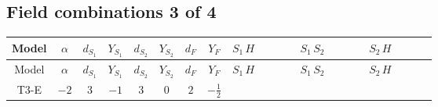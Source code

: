 \documentclass[8pt]{article}
\begin{document}
\begin{landscape}
\subsection*{Field combinations 3 of 4}
\begin{longtable}{@{}cccccccc >{\raggedright\arraybackslash}p{0.21\linewidth} >{\raggedright\arraybackslash}p{0.21\linewidth} >{\raggedright\arraybackslash}p{0.21\linewidth}@{}}
\toprule
Model & $\alpha$ & $d_{S_1}$ & $Y_{S_1}$ & $d_{S_2}$ & $Y_{S_2}$ & $d_F$ & $Y_F$ & $S_1\,H$ & $S_1\,S_2$ & $S_2\,H$ \\
\midrule
\endfirsthead
\toprule
Model & $\alpha$ & $d_{S_1}$ & $Y_{S_1}$ & $d_{S_2}$ & $Y_{S_2}$ & $d_F$ & $Y_F$ & $S_1\,H$ & $S_1\,S_2$ & $S_2\,H$ \\
\midrule
\endhead
T3-E & $-2$ & $3$ & $-1$ & $3$ & $0$ & $2$ & $-\frac{1}{2}$ & \scriptsize\adjustbox{max width=\linewidth}{$\begin{gathered} +\frac{1}{2} H_{a_2} S_{1,j_2} H_{a_1}{}^{\dagger } S_{1,j_1}{}^{\dagger } \mathcal{I}_{H1,a_1,a_2,j_1,j_2}{}^1 \lambda_{HS_1}^{(1)}^{(1)} \\ +\frac{1}{2} H_{a_2} S_{1,j_2} H_{a_1}{}^{\dagger } S_{1,j_1}{}^{\dagger } \mathcal{I}_{H1,a_1,a_2,j_2,j_1}{}^1 \lambda_{HS_1}^{(1)}^{(1)} \\ +\frac{1}{2} H_{a_2} S_{1,j_2} H_{a_1}{}^{\dagger } S_{1,j_1}{}^{\dagger } \mathcal{I}_{H1,a_1,a_2,j_1,j_2}{}^2 \lambda_{HS_1}^{(1)}^{(2)}\end{gathered}$} & \scriptsize\adjustbox{max width=\linewidth}{$\begin{gathered} +S_{1,j_3} S_{2,j_4} S_{1,j_1}{}^{\dagger } S_{2,j_2}{}^{\dagger } \mathcal{I}_{12,j_1,j_3,j_2,j_4}{}^1 \lambda_{12}^{(1)}^{(1)} \\ +S_{1,j_3} S_{2,j_4} S_{1,j_1}{}^{\dagger } S_{2,j_2}{}^{\dagger } \mathcal{I}_{12,j_1,j_3,j_2,j_4}{}^2 \lambda_{12}^{(1)}^{(2)} \\ +S_{1,j_3} S_{2,j_4} S_{1,j_1}{}^{\dagger } S_{2,j_2}{}^{\dagger } \mathcal{I}_{12,j_1,j_3,j_2,j_4}{}^3 \lambda_{12}^{(1)}^{(3)}\end{gathered}$} & \scriptsize\adjustbox{max width=\linewidth}{$\begin{gathered} +\frac{1}{2} H_{a_2} S_{2,j_2} H_{a_1}{}^{\dagger } S_{2,j_1}{}^{\dagger } \mathcal{I}_{H2,a_1,a_2,j_1,j_2}{}^1 \lambda_{HS_2}^{(1)}^{(1)} \\ +\frac{1}{2} H_{a_2} S_{2,j_2} H_{a_1}{}^{\dagger } S_{2,j_1}{}^{\dagger } \mathcal{I}_{H2,a_1,a_2,j_2,j_1}{}^1 \lambda_{HS_2}^{(1)}^{(1)} \\ +\frac{1}{2} H_{a_2} S_{2,j_2} H_{a_1}{}^{\dagger } S_{2,j_1}{}^{\dagger } \mathcal{I}_{H2,a_1,a_2,j_1,j_2}{}^2 \lambda_{HS_2}^{(1)}^{(2)}\end{gathered}$} \\

\end{longtable}
\end{landscape}
\end{document}
